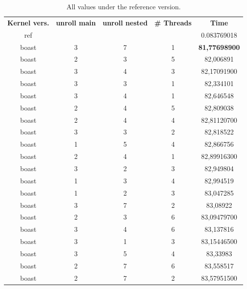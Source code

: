 \documentclass[10pt,twoside]{article}   	%
\begin{document}
\begin{table}[ht!]
\centering
\caption{All values under the reference version.}
{\scriptsize
\begin{tabular}{|c|c|c|c|c|} \hline 
\multirow{2}{*}{ {{\bf{Kernel vers.}}} }	 	 &  \multirow{2}{*}{ {{\bf{unroll main}}} }  &  \multirow{2}{*}{ {{\bf{unroll nested}}} }  &  \multirow{2}{*}{ {{\bf{\# Threads}}} }   &  \multirow{2}{*}{ {{\bf{Time}}} }  \\ 
						 		 &    							    &  	 							  & 	 						      &  				\\ \hline \hline
ref    &   &   &   &  0.083769018 \\ \hline \hline

boast &    3 & 7 & 1 & {\bf{81,77698900}} \\ \hline
boast &   2 & 3 & 5 & 82,006891 \\ \hline
boast &   3 & 4 & 3 & 82,17091900\\ \hline
boast &   3 & 3 & 1 & 82,334101 \\ \hline
boast &   3 & 4 & 1 & 82,646548 \\ \hline
boast &    2 & 4 & 5 & 82,809038 \\ \hline
boast &    2 & 4 & 4 & 82,81120700 \\ \hline
boast &    3 & 3 & 2 & 82,818522 \\ \hline
boast  &    1 & 5 & 4 & 82,866756 \\ \hline
boast &    2 & 4 & 1 & 82,89916300 \\ \hline
boast &    3 & 2 & 3 & 82,949804 \\ \hline
boast  &    1 & 3 & 4 & 82,994519 \\ \hline
boast &    1 & 2 & 3 & 83,047285 \\ \hline
boast &    3 & 7 & 2 & 83,08922 \\ \hline
boast  &    2 & 3 & 6 & 83,09479700 \\ \hline
boast &    3 & 4 & 6 & 83,137816 \\ \hline
boast &    3 & 1 & 3 & 83,15446500 \\ \hline
boast &    3 & 5 & 4 & 83,33983 \\ \hline
boast &    2 & 7 & 6 & 83,558517 \\ \hline
boast &    2 & 7 & 2 & 83,57951500 \\ \hline
\end{tabular}
}
\label{tab:4}
\end{table}





\end{document}
